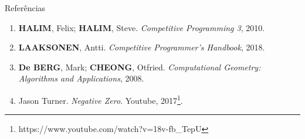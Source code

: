 \begin{frame}[fragile]{Referências}

    \begin{enumerate}
        \item \textbf{HALIM}, Felix; \textbf{HALIM}, Steve. \textit{Competitive Programming 3}, 2010.
        \item \textbf{LAAKSONEN}, Antti. \textit{Competitive Programmer's Handbook}, 2018.

        \item \textbf{De BERG}, Mark; \textbf{CHEONG}, Otfried. \textit{Computational Geometry: Algorithms and Applications}, 2008.

        \item Jason Turner. \textit{Negative Zero}. Youtube, 2017\footnote{https://www.youtube.com/watch?v=18v-fb\_TepU}.

    \end{enumerate}

\end{frame}
